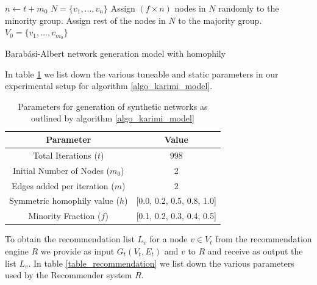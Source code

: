 \begin{algorithm}
	\SetAlgoLined
	\DontPrintSemicolon
	\BlankLine
	$n \leftarrow t+m_{0}$\;
	$N = \{v_{1},...,v_{n}\}$\;
	Assign $(f \times n)$ nodes in $N$ randomly to the minority group. Assign rest of the nodes in $N$ to the majority group.\;
	$V_{0} = \{v_{1},...,v_{m_{0}}\}$\;
	\caption{Barabási-Albert network generation model with homophily \cite{karimi2018homophily}}\label{algo_karimi_model}
\end{algorithm}

In table \ref{table_karimi_model} we list down the various tuneable and static parameters in our experimental setup for algorithm \ref{algo_karimi_model}.

\begin{table}[h]
	\centering
	\begin{tabular}{ |c|c| }
		\hline
		\textbf{Parameter} & \textbf{Value} \\
		\hline
		Total Iterations ($t$) & 998 \\
		Initial Number of Nodes ($m_{0}$) & 2 \\
		Edges added per iteration ($m$) & 2 \\
		Symmetric homophily value ($h$) & [0.0, 0.2, 0.5, 0.8, 1.0] \\
		Minority Fraction ($f$) & [0.1, 0.2, 0.3, 0.4, 0.5] \\
		\hline
	\end{tabular}
	\caption{Parameters for generation of synthetic networks as outlined by algorithm \ref{algo_karimi_model}}
	\label{table_karimi_model}
\end{table}

To obtain the recommendation list $L_{v}$ for a node $v \in V_{t}$ from the recommendation engine $R$ we provide as input $G_{t}(V_{t}, E_{t})$ and $v$ to $R$ and receive as output the list $L_{v}$. In table \ref{table_recommendation} we list down the various parameters used by the Recommender system $R$.


